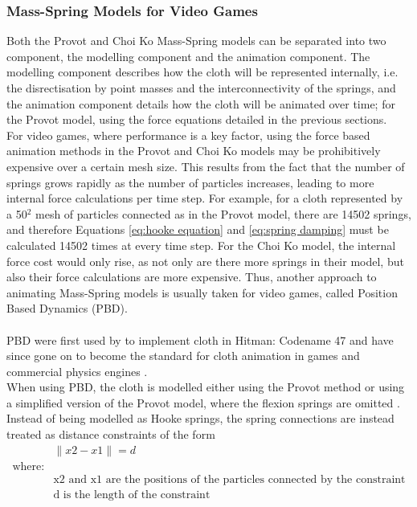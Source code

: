 \subsubsection{Mass-Spring Models for Video Games}
Both the Provot and Choi Ko Mass-Spring models can be separated into two component, the modelling component and the animation component. The modelling component describes how the cloth will be represented internally, i.e. the disrectisation by point masses and the interconnectivity of the springs, and the animation component details how the cloth will be animated over time; for the Provot model, using the force equations detailed in the previous sections. 
\\For video games, where performance is a key factor, using the force based animation methods in the Provot and Choi Ko models may be prohibitively expensive over a certain mesh size. This results from the fact that the number of springs grows rapidly as the number of particles increases, leading to more internal force calculations per time step. For example, for a cloth represented by a 50$^{2}$ mesh of particles connected as in the Provot model, there are 14502 springs, and therefore Equations \ref{eq:hooke equation} and \ref{eq:spring damping} must be calculated 14502 times at every time step. For the Choi Ko model, the internal force cost would only rise, as not only are there more springs in their model, but also their force calculations are more expensive. Thus, another approach to animating Mass-Spring models is usually taken for video games, called Position Based Dynamics (PBD).
\\\\PBD were first used by \textcite{Jakobsen2005} to implement cloth in Hitman: Codename 47 and have since gone on to become the standard for cloth animation in games \parencite{Enqvist2010} and commercial physics engines \parencite{Kim2011}.
\\When using PBD, the cloth is modelled either using the Provot method \parencite{Enqvist2010} or using a simplified version of the Provot model, where the flexion springs are omitted \parencites{Zeller2005}{Kim2011}. Instead of being modelled as Hooke springs, the spring connections are instead treated as distance constraints of the form
\begin{equation}
\begin{split}
\label{eq:distance constraint}
  &\parallel x2 - x1 \parallel = d
\\  \text{where:}
  \\&\text{x2 and x1 are the positions of the particles connected by the constraint}
  \\&\text{d is the length of the constraint}
\end{split}
\end{equation}
